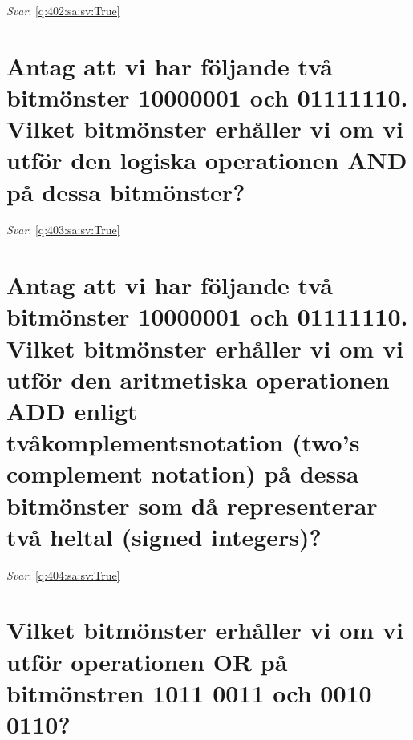 \documentclass[a4paper,11pt,oneside]{book}
\begin{document}
\begin{sloppypar}
\textit{Svar}: \autoref{q:402:sa:sv:True}



\section{Antag att vi har f\"oljande tv\r{a} bitm\"onster 10000001 och 01111110. Vilket bitm\"onster erh\r{a}ller vi om vi utf\"or den logiska operationen AND p\r{a} dessa bitm\"onster?}

\label{q:403:sa:sv:False}

\vspace{2cm}

\noindent\makebox[\textwidth]{\hrulefill}

\vspace{1cm}

\textit{Svar}: \autoref{q:403:sa:sv:True}



\section{Antag att vi har f\"oljande tv\r{a} bitm\"onster 10000001 och 01111110. Vilket bitm\"onster erh\r{a}ller vi om vi utf\"or den aritmetiska operationen ADD enligt tv\r{a}komplementsnotation (two{\textquoteright}s complement notation) p\r{a} dessa bitm\"onster som d\r{a} representerar tv\r{a} heltal (signed integers)?}

\label{q:404:sa:sv:False}

\vspace{2cm}

\noindent\makebox[\textwidth]{\hrulefill}

\vspace{1cm}

\textit{Svar}: \autoref{q:404:sa:sv:True}



\section{Vilket bitm\"onster erh\r{a}ller vi om vi utf\"or operationen OR p\r{a} bitm\"onstren 1011 0011 och 0010 0110?}

\label{q:405:sa:sv:False}

\vspace{2cm}

\noindent\makebox[\textwidth]{\hrulefill}

\vspace{1cm}


\end{sloppypar}
\end{document}
